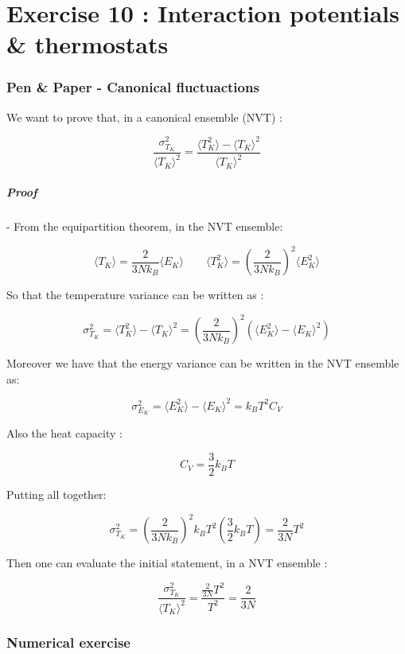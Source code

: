 \chapter*{Exercise 10 : Interaction potentials \& thermostats}

\subsection*{Pen \& Paper - Canonical fluctuactions}

We want to prove that, in a canonical ensemble (NVT) : 

$$ \frac{\sigma^2_{T_K}}{\langle T_K \rangle^2} = \frac{\langle T^2_K \rangle- \langle T_K \rangle^2}{\langle T_K \rangle^2}$$

\paragraph{Proof} - From the equipartition theorem, in the NVT ensemble:

$$ \langle T_K \rangle = \frac{2}{3Nk_B} \langle E_K \rangle \qquad \langle T^2_K \rangle = \left(\frac{2}{3Nk_B}\right)^2 \langle E^2_K \rangle $$

So that the temperature variance can be written as :

$$ \sigma^2_{T_K} = \langle T^2_K \rangle-\langle T_K \rangle^2 = \left(\frac{2}{3Nk_B}\right)^2 (\langle E^2_K \rangle - \langle E_K \rangle^2) $$

Moreover we have that the energy variance can be written in the NVT ensemble as:

$$ \sigma^2_{E_K} = \langle E^2_K \rangle - \langle E_K \rangle^2 = k_B T^2 C_V $$

Also the heat capacity :

$$ C_V = \frac{3}{2}k_B T $$

Putting all together:

$$ \sigma^2_{T_K} = \left(\frac{2}{3Nk_B}\right)^2 k_B T^2 \left(\frac{3}{2}k_B T \right) = \frac{2}{3N}T^2 $$

Then one can evaluate the initial statement, in a NVT ensemble :

$$ \frac{\sigma^2_{T_K}}{\langle T_K \rangle^2} = \frac{\frac{2}{3N}T^2}{T^2} = \frac{2}{3N}$$

\subsection*{Numerical exercise}

